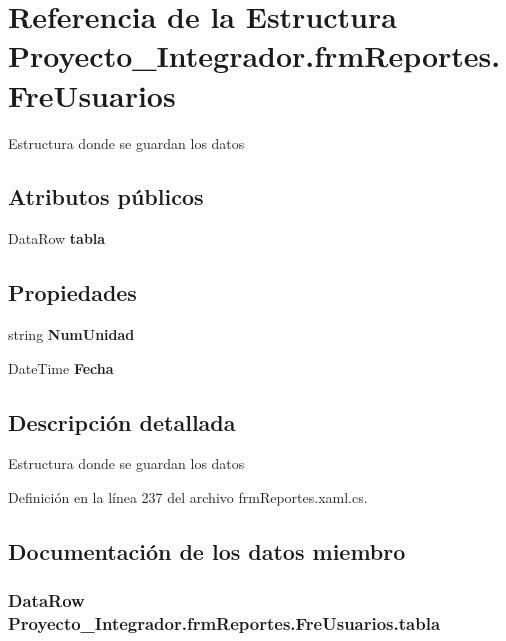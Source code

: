 \section{Referencia de la Estructura Proyecto\-\_\-\-Integrador.\-frm\-Reportes.\-Fre\-Usuarios}
\label{struct_proyecto___integrador_1_1frm_reportes_1_1_fre_usuarios}


Estructura donde se guardan los datos  


\subsection*{Atributos públicos}
\begin{DoxyCompactItemize}
\item 
Data\-Row {\bf tabla}
\end{DoxyCompactItemize}
\subsection*{Propiedades}
\begin{DoxyCompactItemize}
\item 
string {\bf Num\-Unidad}\hspace{0.3cm}{\ttfamily  [get]}
\item 
Date\-Time {\bf Fecha}\hspace{0.3cm}{\ttfamily  [get]}
\end{DoxyCompactItemize}


\subsection{Descripción detallada}
Estructura donde se guardan los datos 



Definición en la línea 237 del archivo frm\-Reportes.\-xaml.\-cs.



\subsection{Documentación de los datos miembro}
\subsubsection[{tabla}]{\setlength{\rightskip}{0pt plus 5cm}Data\-Row Proyecto\-\_\-\-Integrador.\-frm\-Reportes.\-Fre\-Usuarios.\-tabla}\label{struct_proyecto___integrador_1_1frm_reportes_1_1_fre_usuarios_a7f9f3be306205b8dc4e7b89e2e113dfd}


